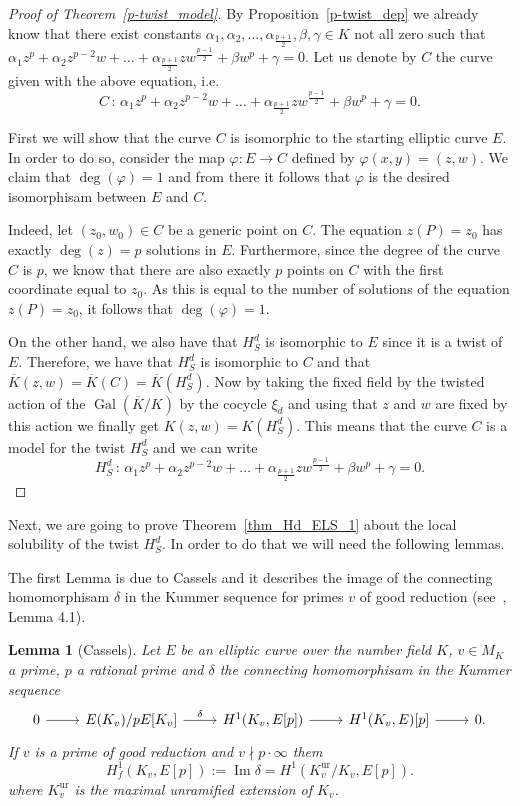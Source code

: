 \documentclass[a4paper, 12pt]{amsart}
\newtheorem{lemma}[theorem]{Lemma}
\theoremstyle{definition}
\theoremstyle{remark}
\DeclareMathOperator{\im}{Im}
\newcommand{\GalK}{\operatorname{Gal}(\overline{K}/K)}
\numberwithin{equation}{section}
\begin{document}
\begin{proof}[Proof of Theorem~\ref{p-twist_model}]
    By Proposition~\ref{p-twist_dep} we already know that there exist constants \newline
    ${\alpha_{1}, \alpha_2, \dotso, \alpha_{\frac{p+1}{2}}, \beta, \gamma \in K}$ not all zero such that $\alpha_{1}z^p+\alpha_2z^{p-2}w+\dotso+\alpha_{\frac{p+1}{2}}zw^{\frac{p-1}{2}}+\beta w^p+\gamma=0$.
    Let us denote by $C$ the curve given with the above equation, i.e.\ 
    \[
        C\,:\, \alpha_{1}z^p+\alpha_2z^{p-2}w+\dotso+\alpha_{\frac{p+1}{2}}zw^{\frac{p-1}{2}}+\beta w^p+\gamma=0.
    \]
    
    First we will show that the curve $C$ is isomorphic to the starting elliptic curve $E$. In order to do so, consider the map $\varphi:E \to C$ defined by $\varphi(x,y)=(z,w)$. We claim that $\deg{(\varphi)}=1$ and from there it follows that $\varphi$ is the desired isomorphisam between $E$ and $C$.

    Indeed, let $(z_0,w_0)\in C$ be a generic point on $C$. The equation $z(P)=z_0$ has exactly $\deg{(z)}=p$ solutions in $E$. Furthermore, since the degree of the curve $C$ is $p$, we know that there are also exactly $p$ points on $C$ with the first coordinate equal to $z_0$. As this is equal to the number of solutions of the equation $z(P)=z_0$, it follows that $\deg{(\varphi)}=1$.

    On the other hand, we also have that $H_S^d$ is isomorphic to $E$ since it is a twist of $E$. Therefore, we have that $H_S^d$ is isomorphic to $C$ and that $\overline{K}(z,w)=\overline{K}(C)=\overline{K}(H_S^d)$. Now by taking the fixed field by the twisted action of the $\GalK$ by the cocycle $\xi_d$ and using that $z$ and $w$ are fixed by this action we finally get $K(z,w)=K(H_S^d)$. This means that the curve $C$ is a model for the twist $H_S^d$ and we can write
    \[
        H_S^d \,:\, \alpha_{1}z^p+\alpha_2z^{p-2}w+\dotso+\alpha_{\frac{p+1}{2}}zw^{\frac{p-1}{2}}+\beta w^p+\gamma=0.
    \]
\end{proof}

Next, we are going to prove Theorem~\ref{thm_Hd_ELS_1} about the local solubility of the twist $H_S^d$. In order to do that we will need the following lemmas.

The first Lemma is due to Cassels and it describes the image of the connecting homomorphisam $\delta$ in the Kummer sequence for primes $v$ of good reduction (see~\cite{MR179169}, Lemma 4.1).
\begin{lemma}[Cassels]\label{lema_cassels}
    Let $E$ be an elliptic curve over the number field $K$, $v \in M_K$ a prime, $p$ a rational prime and $\delta$ the connecting homomorphisam in the Kummer sequence
    \[
        \begin{tikzcd}
            0 \arrow[r] & E(K_v)/pE[K_v] \arrow[r, "\delta"] & H^1(K_v,E[p]) \arrow[r] & H^1(K_v,E)[p] \arrow[r] & 0.
        \end{tikzcd}    
    \]
    If $v$ is a prime of good reduction and $v \nmid p\cdot \infty$ them
    \[
        H_f^1(K_v, E[p]):=\im{\delta}=H^1(K_v^{\operatorname{ur}}/K_v, E[p]).
    \]
    where $K_v^{\operatorname{ur}}$ is the maximal unramified extension of $K_v$.
\end{lemma}
\end{document}
